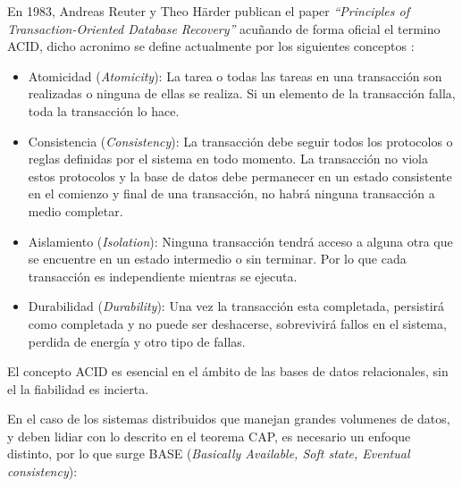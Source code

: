 En 1983, Andreas Reuter y Theo Härder publican el paper \emph{``Principles of Transaction-Oriented Database Recovery''} acuñando de forma oficial el termino ACID, dicho acronimo se define actualmente por los siguientes conceptos \cite{acidbase}:

\begin{itemize}
\item Atomicidad (\emph{Atomicity}): La tarea o todas las tareas en una transacción son realizadas o ninguna de ellas se realiza. Si un elemento de la transacción falla, toda la transacción lo hace.\cite{acidbase}
\item Consistencia (\emph{Consistency}): La transacción debe seguir todos los protocolos o reglas definidas por el sistema en todo momento. La transacción no viola estos protocolos y la base de datos debe permanecer en un estado consistente en el comienzo y final de una transacción, no habrá ninguna transacción a medio completar.\cite{acidbase}
\item Aislamiento (\emph{Isolation}): Ninguna transacción tendrá acceso a alguna otra que se encuentre en un estado intermedio o sin terminar. Por lo que cada transacción es independiente mientras se ejecuta.\cite{acidbase}
\item  Durabilidad (\emph{Durability}): Una vez la transacción esta completada, persistirá como completada y no puede ser deshacerse, sobrevivirá fallos en el sistema, perdida de energía y otro tipo de fallas.\cite{acidbase}
\end{itemize}
    
El concepto ACID es esencial en el ámbito de las bases de datos relacionales, sin el la fiabilidad es incierta.\cite{acidbase}


En el caso de los sistemas distribuidos que manejan grandes volumenes de datos, y deben lidiar con lo descrito en el teorema CAP, es necesario un enfoque distinto, por lo que surge BASE (\emph{Basically Available, Soft state, Eventual consistency})\cite{acidbase}:

